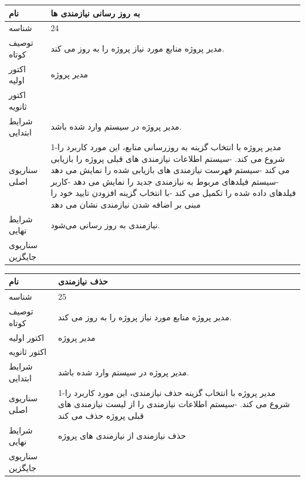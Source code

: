 \vspace{2cm}

\begin{tabular}{|p{2cm}|p{10cm}|}
\hline
نام
&
به روز رسانی نیازمندی ها
\\
\hline
شناسه
&
24
\\
\hline
توصیف کوتاه
&
مدیر پروژه منابع مورد نیاز پروژه را به روز می کند. 
\\
\hline
اکتور اولیه
&
مدیر پروژه
\\
\hline
اکتور ثانویه
&

\\
\hline
شرایط ابتدایی
&
مدیر پروژه در سیستم وارد شده باشد.
\\
\hline
سناریوی اصلی
&
1-مدیر پروژه با انتخاب گزینه به روزرسانی منابع، این مورد کاربرد را شروع می کند.
\newline
2-سیستم اطلاعات نیازمندی های قبلی پروژه را بازیابی می کند
\newline
3-سیستم فهرست نیازمندی های بازیابی شده را نمایش می دهد
\newline
4-سیستم فیلدهای مربوط به نیازمندی جدید را نمایش می دهد
\newline
5-کاربر فیلدهای داده شده را تکمیل می کند
\newline
6-با انتخاب گزینه افزودن تایید خود را مبنی بر اضافه شدن نیازمندی نشان می دهد
\\
\hline
شرایط نهایی
&
نیازمندی به روز رسانی می‌شود.
\\
\hline
سناریوی جایگزین
&

\\
\hline
\end{tabular}

\vspace{2cm}

\begin{tabular}{|p{2cm}|p{10cm}|}
\hline
نام
&
حذف نیازمندی
\\
\hline
شناسه
&
25
\\
\hline
توصیف کوتاه
&
مدیر پروژه منابع مورد نیاز پروژه را به روز می کند. 
\\
\hline
اکتور اولیه
&
مدیر پروژه
\\
\hline
اکتور ثانویه
&

\\
\hline
شرایط ابتدایی
&
مدیر پروژه در سیستم وارد شده باشد.
\\
\hline
سناریوی اصلی
&
1-مدیر پروژه با انتخاب گزینه حذف نیازمندی، این مورد کاربرد را شروع می کند.
\newline
2-سیستم اطلاعات نیازمندی را از لیست نیازمندی های قبلی پروژه حذف می کند
\\
\hline
شرایط نهایی
&
حذف نیازمندی از نیازمندی های پروژه
\\
\hline
سناریوی جایگزین
&

\\
\hline
\end{tabular}

